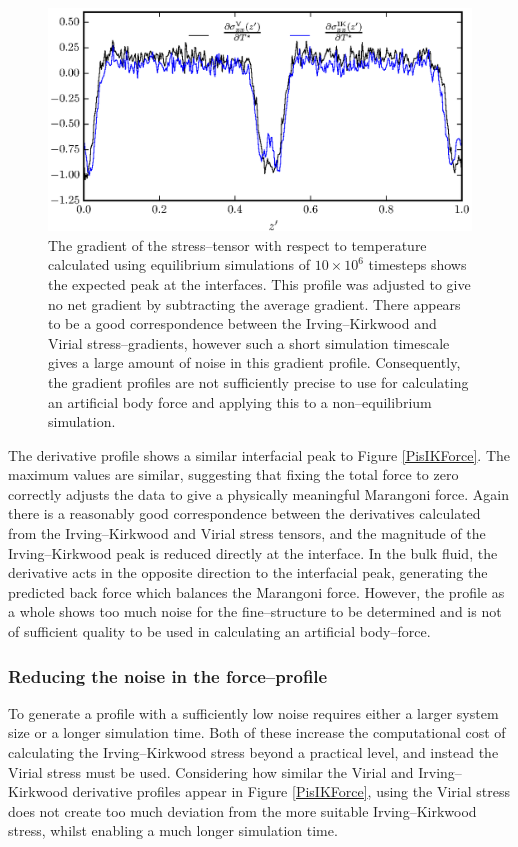 \begin{figure}[h]
\centering
\includegraphics[scale=0.8]{Period10Force}
\caption{The gradient of the stress--tensor with respect to temperature calculated using equilibrium simulations of $10 \times 10^{6}$ timesteps shows the expected peak at the interfaces. 
This profile was adjusted to give no net gradient by subtracting the average gradient.
There appears to be a good correspondence between the Irving--Kirkwood and Virial stress--gradients, however such a short simulation timescale gives a large amount of noise in this gradient profile.
Consequently, the gradient profiles are not sufficiently precise to use for calculating an artificial body force and applying this to a non--equilibrium simulation.
}
\label{Period10Force}
\end{figure}
The derivative profile shows a similar interfacial peak to Figure \ref{PisIKForce}. 
The maximum values are similar, suggesting that fixing the total force to zero correctly adjusts the data to give a physically meaningful Marangoni force.
Again there is a reasonably good correspondence between the derivatives calculated from the Irving--Kirkwood and Virial stress tensors, and the magnitude of the Irving--Kirkwood peak is reduced directly at the interface.
In the bulk fluid, the derivative acts in the opposite direction to the interfacial peak, generating the predicted back force which balances the Marangoni force.
However, the profile as a whole shows too much noise for the fine--structure to be determined and is not of sufficient quality to be used in calculating an artificial body--force.

\subsubsection{Reducing the noise in the force--profile}
To generate a profile with a sufficiently low noise requires either a larger system size or a longer simulation time.
Both of these increase the computational cost of calculating the Irving--Kirkwood stress beyond a practical level, and instead the Virial stress must be used.
Considering how similar the Virial and Irving--Kirkwood derivative profiles appear in Figure \ref{PisIKForce}, using the Virial stress does not create too much deviation from the more suitable Irving--Kirkwood stress, whilst enabling a much longer simulation time.
\FloatBarrier

